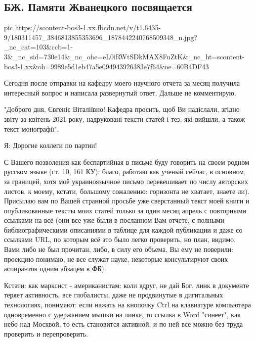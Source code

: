 
 
 
 
 

\subsection{БЖ. Памяти Жванецкого посвящается}
\label{sec:29_04_2021.fb.bilchenko_evgenia.1.zhvaneckii_pamjat}


\ifcmt
  pic https://scontent-bos3-1.xx.fbcdn.net/v/t1.6435-9/180311457_3846813855353696_1878442240768509348_n.jpg?_nc_cat=103&ccb=1-3&_nc_sid=730e14&_nc_ohc=eL0iRWtSDkMAX8FuZtK&_nc_ht=scontent-bos3-1.xx&oh=9989e5d1eb47a5e094943926383e7f64&oe=60B4DF43
\fi


Сегодня после отправки на кафедру моего научного отчета за месяц получила
интересный вопрос и написала развернутый ответ. Дальше не комментирую. 

"Доброго дня, Євгеніє Віталіївно! Кафедра просить, щоб Ви надіслали, згідно
звіту за квітень 2021 року, надруковані тексти статей і тез, які вийшли, а
також текст монографії".

Я: Дорогие коллеги по партии! 

С Вашего позволения как беспартийная в письме буду говорить на своем родном
русском языке (ст. 10, 161 КУ): благо, работаю как ученый сейчас, в основном,
за границей, хотя моё украиноязычное письмо перевешивает по числу авторских
листов, к моему, кстати, большому сожалению: горизонта не хватает, знаете ли).
Присылаю вам по Вашей странной просьбе уже сверстанный текст моей книги и
опубликованные тексты моих статей только за один месяц апрель с повторными
ссылками на всё (они все уже были в посланном Вам отчете, с полными
библиографическими описаниями в таблице для каждой публикации и даже со
ссылками URL, по которым всё это было легко проверить, но план, видимо, Вами
либо не был прочитан, либо, в силу его объема, Вы ему не поверили: проекцию
понимаю, не все служат науке, некоторые консультируют своих аспирантов одним
абзацем в ФБ).  

Кстати: как марксист - американистам: коли вдруг, не дай Бог, линк в документе
теряет активность, все глобалисты, даже не продвинутые в дигитальных
технологиях, понимают: если нажать на кнопочку Ctrl  на клавиатуре компьютера
одновременно с удержанием мышки на линке, то ссылка в Word "синеет", как небо
над Москвой, то есть становится активной, и по ней всё можно без труда
проверить и перепроверить. 

